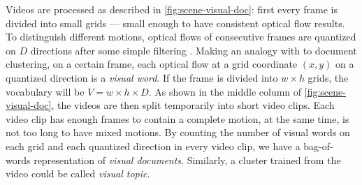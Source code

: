 Videos are processed as described in \ref{fig:scene-visual-doc}: first every frame is divided into small grids --- small enough to have consistent optical flow results. 
To distinguish different motions, optical flows of consecutive frames are quantized on $D$ directions after some simple filtering \cite{kalal2010forward}. 
Making an analogy with to document clustering, on a certain frame, each optical flow at a grid coordinate $(x, y)$ on a quantized direction is a \emph{visual word}.
If the frame is divided into $w\times h$ grids, the vocabulary will be $V = w\times h\times D$.
As shown in the middle column of \ref{fig:scene-visual-doc}, the videos are then split temporarily into short video clips. 
Each video clip has enough frames to contain a complete motion, at the same time, is not too long to have mixed motions. 
By counting the number of visual words on each grid and each quantized direction in every video clip, we have a bag-of-words representation of \emph{visual documents}. 
Similarly, a cluster trained from the video could be called \emph{visual topic}.



